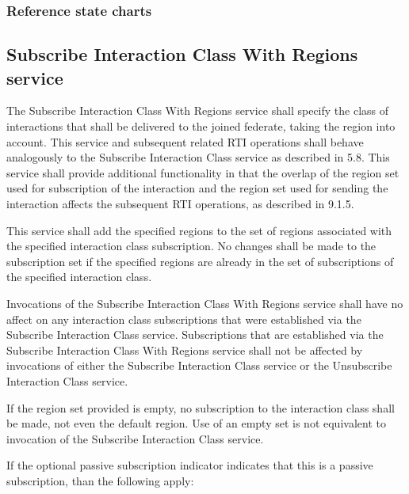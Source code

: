 \begin{compactstdpage}

    \subsubsection{Reference state charts}


    \subsection{Subscribe Interaction Class With Regions service}

    The Subscribe Interaction Class With Regions service shall specify the class of interactions that shall be delivered to the joined federate, taking the region into account. This service and subsequent related RTI operations shall behave analogously to the Subscribe Interaction Class service as described in 5.8. This service shall provide additional functionality in that the overlap of the region set used for subscription of the interaction and the region set used for sending the interaction affects the subsequent RTI operations, as described in 9.1.5.

    This service shall add the specified regions to the set of regions associated with the specified interaction class subscription. No changes shall be made to the subscription set if the specified regions are already in the set of subscriptions of the specified interaction class.

    Invocations of the Subscribe Interaction Class With Regions service shall have no affect on any interaction class subscriptions that were established via the Subscribe Interaction Class service. Subscriptions that are established via the Subscribe Interaction Class With Regions service shall not be affected by invocations of either the Subscribe Interaction Class service or the Unsubscribe Interaction Class service.

    If the region set provided is empty, no subscription to the interaction class shall be made, not even the default region. Use of an empty set is not equivalent to invocation of the Subscribe Interaction Class service.

    If the optional passive subscription indicator indicates that this is a passive subscription, than the following apply:


\end{compactstdpage}
